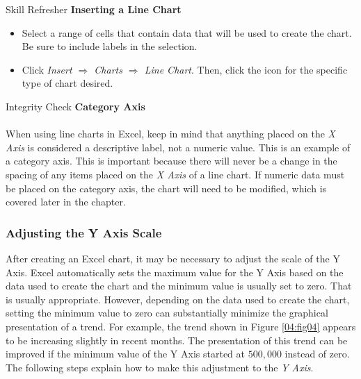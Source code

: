 \begin{center}
	\begin{sklbox}{Skill Refresher}
		\textbf{Inserting a Line Chart}
		\\
		\begin{itemize}
			\setlength{\itemsep}{0pt}
			\setlength{\parskip}{0pt}
			\setlength{\parsep}{0pt}

			\item Select a range of cells that contain data that will be used to create the chart. Be sure to include labels in the selection.
			\item Click \textit{Insert $ \Rightarrow $ Charts $ \Rightarrow $ Line Chart}. Then, click the icon for the specific type of chart desired.
			
		\end{itemize}
	\end{sklbox}
\end{center}

\begin{center}
	\begin{infobox}{Integrity Check}
		\textbf{Category Axis}
		\\
		\\
		When using line charts in Excel, keep in mind that anything placed on the \textit{X Axis} is considered a descriptive label, not a numeric value. This is an example of a category axis. This is important because there will never be a change in the spacing of any items placed on the \textit{X Axis} of a line chart. If numeric data must be placed on the category axis, the chart will need to be modified, which is covered later in the chapter.
	\end{infobox}
\end{center}

\subsubsection{Adjusting the Y Axis Scale}

After creating an Excel chart, it may be necessary to adjust the scale of the Y Axis. Excel automatically sets the maximum value for the Y Axis based on the data used to create the chart and the minimum value is usually set to zero. That is usually appropriate. However, depending on the data used to create the chart, setting the minimum value to zero can substantially minimize the graphical presentation of a trend. For example, the trend shown in Figure \ref{04:fig04} appears to be increasing slightly in recent months. The presentation of this trend can be improved if the minimum value of the Y Axis started at $ 500,000 $ instead of zero. The following steps explain how to make this adjustment to the \textit{Y Axis}.

